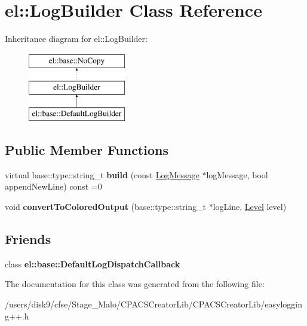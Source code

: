 \hypertarget{classel_1_1LogBuilder}{\section{el\-:\-:Log\-Builder Class Reference}
\label{classel_1_1LogBuilder}
}
Inheritance diagram for el\-:\-:Log\-Builder\-:\begin{figure}[H]
\begin{center}
\leavevmode
\includegraphics[height=3.000000cm]{classel_1_1LogBuilder}
\end{center}
\end{figure}
\subsection*{Public Member Functions}
\begin{DoxyCompactItemize}
\item 
\hypertarget{classel_1_1LogBuilder_a633b373a3bb9d3e17bdd664aeba4dbc8}{virtual base\-::type\-::string\-\_\-t {\bfseries build} (const \hyperlink{classel_1_1LogMessage}{Log\-Message} $\ast$log\-Message, bool append\-New\-Line) const =0}\label{classel_1_1LogBuilder_a633b373a3bb9d3e17bdd664aeba4dbc8}

\item 
\hypertarget{classel_1_1LogBuilder_a229244f323f25bdbd7725f8bbf983a17}{void {\bfseries convert\-To\-Colored\-Output} (base\-::type\-::string\-\_\-t $\ast$log\-Line, \hyperlink{namespaceel_ab0ac6091262344c52dd2d3ad099e8e36}{Level} level)}\label{classel_1_1LogBuilder_a229244f323f25bdbd7725f8bbf983a17}

\end{DoxyCompactItemize}
\subsection*{Friends}
\begin{DoxyCompactItemize}
\item 
\hypertarget{classel_1_1LogBuilder_a42b1de96d584ae4fecbfc2b9aff95052}{class {\bfseries el\-::base\-::\-Default\-Log\-Dispatch\-Callback}}\label{classel_1_1LogBuilder_a42b1de96d584ae4fecbfc2b9aff95052}

\end{DoxyCompactItemize}


The documentation for this class was generated from the following file\-:\begin{DoxyCompactItemize}
\item 
/users/disk9/cfse/\-Stage\-\_\-\-Malo/\-C\-P\-A\-C\-S\-Creator\-Lib/\-C\-P\-A\-C\-S\-Creator\-Lib/easylogging++.\-h\end{DoxyCompactItemize}
